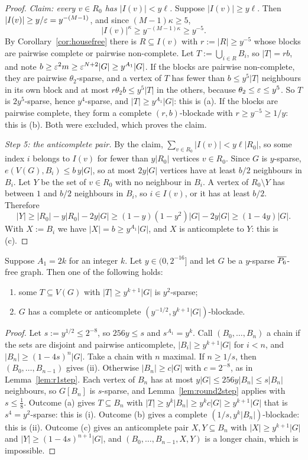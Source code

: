 \begin{proof}
\emph{Claim: every $v\in R_0$ has $|I(v)|<y\ell$.} Suppose $|I(v)|\ge y\ell$. Then $|I(v)|\ge
y/\varepsilon=y^{-(M-1)}$, and since $(M-1)\kappa\ge5$,
\[
|I(v)|^\kappa\ge y^{-(M-1)\kappa}\ge y^{-5}.
\]
By Corollary~\ref{cor:housefree} there is $R\subseteq I(v)$ with $r:=|R|\ge y^{-5}$ whose blocks are pairwise
complete or pairwise non-complete. Let $T:=\bigcup_{i\in R}B_i$, so $|T|=rb$, and note $b\ge\varepsilon^2m\ge
\varepsilon^{N+2}|G|\ge y^{A_1}|G|$. If the blocks are pairwise non-complete, they are pairwise $\theta_2$-sparse, and
a vertex of $T$ has fewer than $b\le y^5|T|$ neighbours in its own block and at most $r\theta_2b\le y^5|T|$ in the
others, because $\theta_2\le\varepsilon\le y^5$. So $T$ is $2y^5$-sparse, hence $y^4$-sparse, and $|T|\ge y^{A_1}|G|$:
this is (a). If the blocks are pairwise complete, they form a complete $(r,b)$-blockade with $r\ge y^{-5}\ge
1/y$: this is (b). Both were excluded, which proves the claim.

\emph{Step 5: the anticomplete pair.} By the claim, $\sum_{v\in R_0}|I(v)|<y\ell|R_0|$, so some index $i$
belongs to $I(v)$ for fewer than $y|R_0|$ vertices $v\in R_0$. Since $G$ is $y$-sparse, $e(V(G),B_i)\le
b\,y|G|$, so at most $2y|G|$ vertices have at least $b/2$ neighbours in $B_i$. Let $Y$ be the set of $v\in
R_0$ with no neighbour in $B_i$. A vertex of $R_0\setminus Y$ has between $1$ and $b/2$ neighbours in $B_i$,
so $i\in I(v)$, or it has at least $b/2$. Therefore
\[
|Y|\ge|R_0|-y|R_0|-2y|G|\ge(1-y)(1-y^2)|G|-2y|G|\ge(1-4y)|G| .
\]
With $X:=B_i$ we have $|X|=b\ge y^{A_1}|G|$, and $X$ is anticomplete to $Y$: this is (c).
\end{proof}

\begin{lemma}\label{lem:round2}
Suppose $A_1=2k$ for an integer $k$. Let $y\in(0,2^{-16}]$ and let $G$ be a $y$-sparse $\overline{P_6}$-free graph.
Then one of the following holds:
\begin{enumerate}[label=(\roman*)]
\item some $T\subseteq V(G)$ with $|T|\ge y^{k+1}|G|$ is $y^2$-sparse;
\item $G$ has a complete or anticomplete $(y^{-1/2},y^{k+1}|G|)$-blockade.
\end{enumerate}
\end{lemma}
\begin{proof}
Let $s:=y^{1/2}\le2^{-8}$, so $256y\le s$ and $s^{A_1}=y^k$. Call $(B_0,\dots,B_n)$ a chain if the sets are
disjoint and pairwise anticomplete, $|B_i|\ge y^{k+1}|G|$ for $i<n$, and $|B_n|\ge(1-4s)^n|G|$. Take a chain
with $n$ maximal. If $n\ge1/s$, then $(B_0,\dots,B_{n-1})$ gives (ii). Otherwise $|B_n|\ge c|G|$ with
$c=2^{-8}$, as in Lemma~\ref{lem:r1step}. Each vertex of $B_n$ has at most $y|G|\le256y|B_n|\le s|B_n|$
neighbours, so $G[B_n]$ is $s$-sparse, and Lemma~\ref{lem:round2step} applies with $s\le\frac18$.
Outcome (a) gives $T\subseteq B_n$ with $|T|\ge y^k|B_n|\ge y^kc|G|\ge y^{k+1}|G|$ that is $s^4=y^2$-sparse:
this is (i). Outcome (b) gives a complete $(1/s,y^k|B_n|)$-blockade: this is (ii). Outcome (c) gives an
anticomplete pair $X,Y\subseteq B_n$ with $|X|\ge y^{k+1}|G|$ and $|Y|\ge(1-4s)^{n+1}|G|$, and
$(B_0,\dots,B_{n-1},X,Y)$ is a longer chain, which is impossible.
\end{proof}
